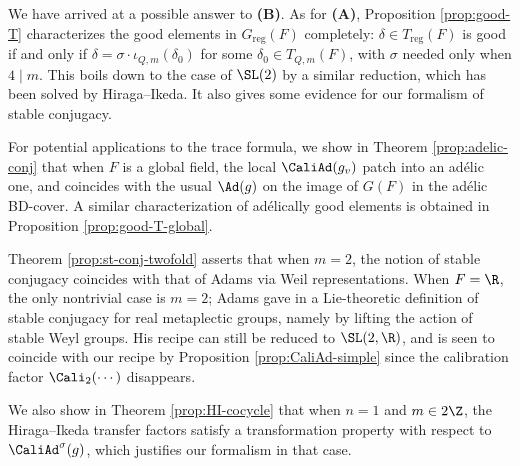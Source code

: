 \documentclass[a4paper,10pt]{article}
\begin{document}
We have arrived at a possible answer to \textbf{(B)}. As for \textbf{(A)}, Proposition \ref{prop:good-T} characterizes the good elements in $G_\text{reg}(F)$ completely: $\delta \in T_\text{reg}(F)$ is good if and only if $\delta = \sigma \cdot \iota_{Q,m}(\delta_0)$ for some $\delta_0 \in T_{Q,m}(F)$, with $\sigma$ needed only when $4 \mid m$. This boils down to the case of $\SL(2)$ by a similar reduction, which has been solved by Hiraga--Ikeda. It also gives some evidence for our formalism of stable conjugacy.

For potential applications to the trace formula, we show in Theorem \ref{prop:adelic-conj} that when $F$ is a global field, the local $\CaliAd(g_v)$ patch into an adélic one, and coincides with the usual $\Ad(g)$ on the image of $G(F)$ in the adélic BD-cover. A similar characterization of adélically good elements is obtained in Proposition \ref{prop:good-T-global}.

Theorem \ref{prop:st-conj-twofold} asserts that when $m=2$, the notion of stable conjugacy coincides with that of Adams via Weil representations. When $F=\R$, the only nontrivial case is $m=2$; Adams gave in \cite[Definition 3.4]{Ad98} a Lie-theoretic definition of stable conjugacy for real metaplectic groups, namely by lifting the action of stable Weyl groups. His recipe can still be reduced to $\SL(2, \R)$, and is seen to coincide with our recipe by Proposition \ref{prop:CaliAd-simple} since the calibration factor $\Cali_2(\cdots)$ disappears.

We also show in Theorem \ref{prop:HI-cocycle} that when $n=1$ and $m \in 2\Z$, the Hiraga--Ikeda transfer factors satisfy a transformation property with respect to $\CaliAd^\sigma(g)$, which justifies our formalism in that case.
\end{document}
